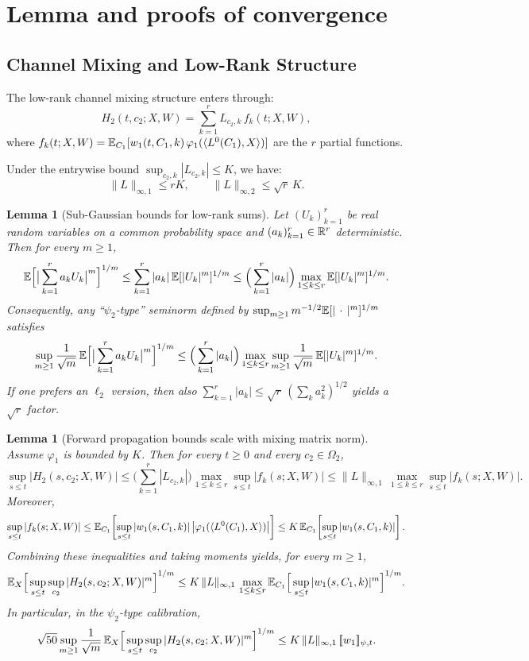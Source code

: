 \documentclass[nohyperref]{article}
\theoremstyle{plain}
\newtheorem{lemma}[theorem]{Lemma}
\theoremstyle{definition}
\theoremstyle{remark}
\begin{document}
\section{Lemma and proofs of convergence}
\label{app:technical-lemmas}

\subsection{Channel Mixing and Low-Rank Structure}
\label{app:channel-mixing}

The low-rank channel mixing structure enters through:
\[
H_2(t,c_2;X,W)=\sum_{k=1}^r L_{c_2,k}\,f_k(t;X,W),
\]
where $f_k(t;X,W)=\mathbb{E}_{C_1}[w_1(t,C_1,k)\,\varphi_1(\langle L^0(C_1), X \rangle)]$ are the $r$ partial functions.

Under the entrywise bound $\sup_{c_2,k}|L_{c_2,k}|\le K$, we have:
\[
\|L\|_{\infty,1}\le rK,\qquad \|L\|_{\infty,2}\le \sqrt{r}\,K.
\]

\begin{lemma}[Sub-Gaussian bounds for low-rank sums]
\label{lem:lowrank-psi-app}
Let $(U_k)_{k=1}^r$ be real random variables on a common probability space and $(a_k)_{k=1}^r\in\R^r$ deterministic.
Then for every $m\ge 1$,
\[
\mathbb{E}\Big[\big|\sum_{k=1}^r a_k U_k\big|^m\Big]^{1/m}\le \sum_{k=1}^r |a_k|\,\mathbb{E}[|U_k|^m]^{1/m}
\le \Big(\sum_{k=1}^r |a_k|\Big)\max_{1\le k\le r}\mathbb{E}[|U_k|^m]^{1/m}.
\]
Consequently, any ``$\psi_2$-type'' seminorm defined by $\sup_{m\ge 1}m^{-1/2}\mathbb{E}[|\,\cdot\,|^m]^{1/m}$ satisfies
\[
\sup_{m\ge 1}\frac{1}{\sqrt{m}}\,\mathbb{E}\Big[\big|\sum_{k=1}^r a_k U_k\big|^m\Big]^{1/m}
\le \Big(\sum_{k=1}^r |a_k|\Big)\max_{1\le k\le r}\sup_{m\ge 1}\frac{1}{\sqrt{m}}\,\mathbb{E}[|U_k|^m]^{1/m}.
\]
If one prefers an $\ell_2$ version, then also $\sum_{k=1}^r |a_k|\le \sqrt{r}\,(\sum_k a_k^2)^{1/2}$ yields a $\sqrt{r}$ factor.
\end{lemma}

\begin{lemma}[Forward propagation bounds scale with mixing matrix norm]
\label{lem:H2-row-norm-app}
Assume $\varphi_1$ is bounded by $K$.
Then for every $t\ge 0$ and every $c_2\in\Omega_2$,
\[
\sup_{s\le t}\big|H_2(s,c_2;X,W)\big|
\le \Big(\sum_{k=1}^r |L_{c_2,k}|\Big)\max_{1\le k\le r}\sup_{s\le t}|f_k(s;X,W)|
\le \|L\|_{\infty,1}\,\max_{1\le k\le r}\sup_{s\le t}|f_k(s;X,W)|.
\]
Moreover,
\[
\sup_{s\le t}|f_k(s;X,W)|
\le \mathbb{E}_{C_1}\!\left[\sup_{s\le t}|w_1(s,C_1,k)|\,\big|\varphi_1(\langle L^0(C_1), X \rangle)\big|\right]
\le K\,\mathbb{E}_{C_1}\!\left[\sup_{s\le t}|w_1(s,C_1,k)|\right].
\]
Combining these inequalities and taking moments yields, for every $m\ge 1$,
\[
\mathbb{E}_X\Big[\sup_{s\le t}\sup_{c_2}|H_2(s,c_2;X,W)|^m\Big]^{1/m}
\le K\,\|L\|_{\infty,1}\,\max_{1\le k\le r}\mathbb{E}_{C_1}\Big[\sup_{s\le t}|w_1(s,C_1,k)|^m\Big]^{1/m}.
\]
In particular, in the $\psi_2$-type calibration,
\[
\sqrt{50}\sup_{m\ge 1}\frac{1}{\sqrt{m}}\,
\mathbb{E}_X\Big[\sup_{s\le t}\sup_{c_2}|H_2(s,c_2;X,W)|^m\Big]^{1/m}
\le K\,\|L\|_{\infty,1}\,[\![ w_1]\!]_{\psi,t}.
\]
\end{lemma}
\end{document}
